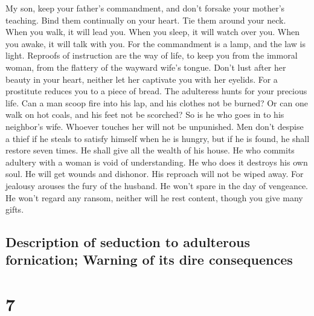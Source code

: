  My son, keep your father's commandment, and don't
forsake your mother's teaching.  Bind them continually on
your heart. Tie them around your neck.  When you walk, it
will lead you. When you sleep, it will watch over you. When you awake,
it will talk with you.  For the commandment is a lamp,
and the law is light. Reproofs of instruction are the way of life,
 to keep you from the immoral woman, from the flattery of
the wayward wife's tongue.  Don't lust after her beauty
in your heart, neither let her captivate you with her eyelids.
 For a prostitute reduces you to a piece of bread. The
adulteress hunts for your precious life.  Can a man scoop
fire into his lap, and his clothes not be burned?  Or can
one walk on hot coals, and his feet not be scorched?  So
is he who goes in to his neighbor's wife. Whoever touches her will not
be unpunished.  Men don't despise a thief if he steals to
satisfy himself when he is hungry,  but if he is found,
he shall restore seven times. He shall give all the wealth of his house.
 He who commits adultery with a woman is void of
understanding. He who does it destroys his own soul.  He
will get wounds and dishonor. His reproach will not be wiped away.
 For jealousy arouses the fury of the husband. He won't
spare in the day of vengeance.  He won't regard any
ransom, neither will he rest content, though you give many gifts.

\hypertarget{description-of-seduction-to-adulterous-fornication-warning-of-its-dire-consequences}{%
\subsection{Description of seduction to adulterous fornication; Warning
of its dire
consequences}\label{description-of-seduction-to-adulterous-fornication-warning-of-its-dire-consequences}}

\hypertarget{section-6}{%
\section{7}\label{section-6}}

